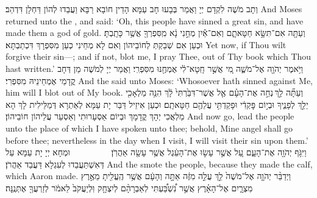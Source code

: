 {וְתָב מֹשֶׁה לִקְדָם יְיָ וַאֲמַר בְּבָעוּ חָב עַמָּא הָדֵין חוֹבָא רַבָּא וַעֲבַדוּ לְהוֹן דַּחְלָן דִּדְהַב׃}
{And Moses returned unto the \lord, and said: ‘Oh, this people have sinned a great sin, and have made them a god of gold.}{}
{וְעַתָּ֖ה אִם־תִּשָּׂ֣א חַטָּאתָ֑ם וְאִם־אַ֕יִן מְחֵ֣נִי נָ֔א מִֽסִּפְרְךָ֖ אֲשֶׁ֥ר כָּתָֽבְתָּ׃
}
{וּכְעַן אִם שְׁבַקְתְּ לְחוֹבֵיהוֹן וְאִם לָא מְחֵינִי כְעַן מִסִּפְרָךְ דִּכְתַבְתָּא׃}
{Yet now, if Thou wilt forgive their sin—; and if not, blot me, I pray Thee, out of Thy book which Thou hast written.’}{}
{וַיֹּ֥אמֶר יְהֹוָ֖ה אֶל־מֹשֶׁ֑ה מִ֚י אֲשֶׁ֣ר חָֽטָא־לִ֔י אֶמְחֶ֖נּוּ מִסִּפְרִֽי׃}
{וַאֲמַר יְיָ לְמֹשֶׁה מַן דְּחָב קֳדָמַי אֶמְחֵינֵיהּ מִסִּפְרִי׃}
{And the \lord\space said unto Moses: ‘Whosoever hath sinned against Me, him will I blot out of My book.}{}
{וְעַתָּ֞ה לֵ֣ךְ \legarmeh  נְחֵ֣ה אֶת־הָעָ֗ם אֶ֤ל אֲשֶׁר־דִּבַּ֙רְתִּי֙ לָ֔ךְ הִנֵּ֥ה מַלְאָכִ֖י יֵלֵ֣ךְ לְפָנֶ֑יךָ וּבְי֣וֹם פׇּקְדִ֔י וּפָקַדְתִּ֥י עֲלֵהֶ֖ם חַטָּאתָֽם׃
}
{וּכְעַן אִיזֵיל דַּבַּר יָת עַמָּא לְאַתְרָא דְּמַלֵּילִית לָךְ הָא מַלְאֲכִי יְהָךְ קֳדָמָךְ וּבְיוֹם אַסְעָרוּתִי וְאַסְעַר עֲלֵיהוֹן חוֹבֵיהוֹן׃}
{And now go, lead the people unto the place of which I have spoken unto thee; behold, Mine angel shall go before thee; nevertheless in the day when I visit, I will visit their sin upon them.’}{}
{וַיִּגֹּ֥ף יְהֹוָ֖ה אֶת־הָעָ֑ם עַ֚ל אֲשֶׁ֣ר עָשׂ֣וּ אֶת־הָעֵ֔גֶל אֲשֶׁ֥ר עָשָׂ֖ה אַהֲרֹֽן׃ \setuma         
}
{וּמְחָא יְיָ יָת עַמָּא עַל דְּאִשְׁתַּעֲבַדוּ לְעִגְלָא דַּעֲבַד אַהֲרֹן׃}
{And the \lord\space smote the people, because they made the calf, which Aaron made.}{}
\newperek
{}%
{וַיְדַבֵּ֨ר יְהֹוָ֤ה אֶל־מֹשֶׁה֙ לֵ֣ךְ עֲלֵ֣ה מִזֶּ֔ה אַתָּ֣ה וְהָעָ֔ם אֲשֶׁ֥ר הֶֽעֱלִ֖יתָ מֵאֶ֣רֶץ מִצְרָ֑יִם אֶל־הָאָ֗רֶץ אֲשֶׁ֣ר נִ֠שְׁבַּ֠עְתִּי לְאַבְרָהָ֨ם לְיִצְחָ֤ק וּֽלְיַעֲקֹב֙ לֵאמֹ֔ר לְזַרְעֲךָ֖ אֶתְּנֶֽנָּה׃
}
